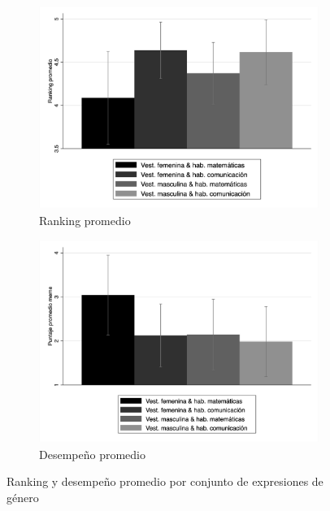 \begin{figure}[htbp]
    \centering
    \begin{subfigure}{0.49\textwidth}
        \centering
        \caption{Ranking promedio}
        \includegraphics[width=\textwidth]{Images/ranking.png}
    \end{subfigure}
    \begin{subfigure}{0.49\textwidth}
        \centering
        \caption{Desempeño promedio}
        \includegraphics[width=\textwidth]{Images/performance.png}
    \end{subfigure}
    \caption{Ranking y desempeño promedio por conjunto de expresiones de género}
    \label{fig:performance}
    \begin{singlespace}
    \end{singlespace}
\end{figure}

